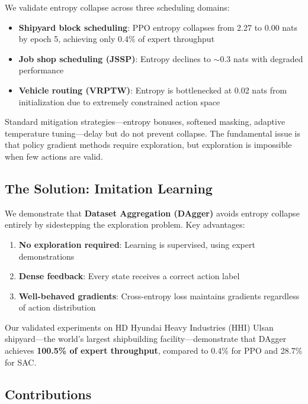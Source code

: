 We validate entropy collapse across three scheduling domains:

\begin{itemize}
    \item \textbf{Shipyard block scheduling}: PPO entropy collapses from 2.27 to 0.00 nats by epoch 5, achieving only 0.4\% of expert throughput
    \item \textbf{Job shop scheduling (JSSP)}: Entropy declines to $\sim$0.3 nats with degraded performance
    \item \textbf{Vehicle routing (VRPTW)}: Entropy is bottlenecked at 0.02 nats from initialization due to extremely constrained action space
\end{itemize}

Standard mitigation strategies---entropy bonuses, softened masking, adaptive temperature tuning---delay but do not prevent collapse. The fundamental issue is that policy gradient methods require exploration, but exploration is impossible when few actions are valid.

\subsection{The Solution: Imitation Learning}

We demonstrate that \textbf{Dataset Aggregation (DAgger)} avoids entropy collapse entirely by sidestepping the exploration problem. Key advantages:

\begin{enumerate}
    \item \textbf{No exploration required}: Learning is supervised, using expert demonstrations
    \item \textbf{Dense feedback}: Every state receives a correct action label
    \item \textbf{Well-behaved gradients}: Cross-entropy loss maintains gradients regardless of action distribution
\end{enumerate}

Our validated experiments on HD Hyundai Heavy Industries (HHI) Ulsan shipyard---the world's largest shipbuilding facility---demonstrate that DAgger achieves \textbf{100.5\% of expert throughput}, compared to 0.4\% for PPO and 28.7\% for SAC.

\subsection{Contributions}

